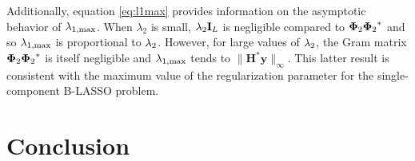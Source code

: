 \documentclass[12pt]{article}
\begin{document}

    Additionally, equation \eqref{eq:l1max} provides information on the asymptotic behavior of $\lambda_{1, \mathrm{max}}$. When $\lambda_2$ is small, $\lambda_{2} \mathbf{I}_L$ is negligible compared to ${\bm{\Phi}_2} {\bm{\Phi}_2}^*$ and so $\lambda_{1, \mathrm{max}}$ is proportional to $\lambda_{2}$. However, for large values of $\lambda_{2}$, the Gram matrix ${\bm{\Phi}_2} {\bm{\Phi}_2}^*$ is itself negligible and $\lambda_{1, \mathrm{max}}$ tends to $\lVert \mathbf{H}^* \bm{y}\rVert_\infty$. This latter result is consistent with the maximum value of the regularization parameter for the single-component B-LASSO problem.






\section{Conclusion}

\end{document}
